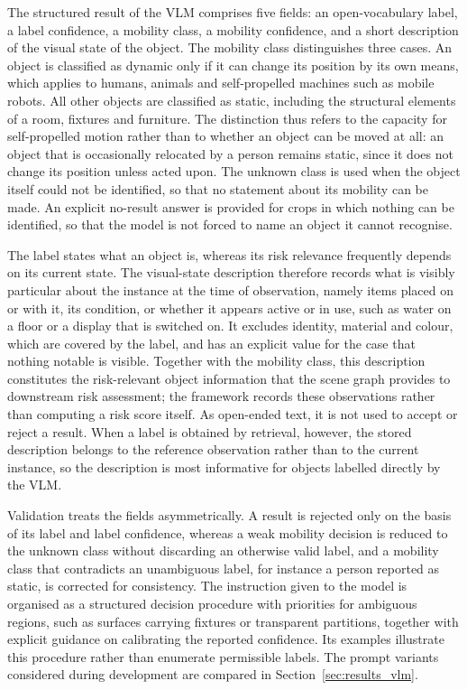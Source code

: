 {\small

The structured result of the VLM comprises five fields: an open-vocabulary label, a label confidence, a mobility class, a mobility confidence, and a short description of the visual state of the object. The mobility class distinguishes three cases. An object is classified as dynamic only if it can change its position by its own means, which applies to humans, animals and self-propelled machines such as mobile robots. All other objects are classified as static, including the structural elements of a room, fixtures and furniture. The distinction thus refers to the capacity for self-propelled motion rather than to whether an object can be moved at all: an object that is occasionally relocated by a person remains static, since it does not change its position unless acted upon. The unknown class is used when the object itself could not be identified, so that no statement about its mobility can be made. An explicit no-result answer is provided for crops in which nothing can be identified, so that the model is not forced to name an object it cannot recognise.

The label states what an object is, whereas its risk relevance frequently depends on its current state. The visual-state description therefore records what is visibly particular about the instance at the time of observation, namely items placed on or with it, its condition, or whether it appears active or in use, such as water on a floor or a display that is switched on. It excludes identity, material and colour, which are covered by the label, and has an explicit value for the case that nothing notable is visible. Together with the mobility class, this description constitutes the risk-relevant object information that the scene graph provides to downstream risk assessment; the framework records these observations rather than computing a risk score itself. As open-ended text, it is not used to accept or reject a result. When a label is obtained by retrieval, however, the stored description belongs to the reference observation rather than to the current instance, so the description is most informative for objects labelled directly by the VLM.

Validation treats the fields asymmetrically. A result is rejected only on the basis of its label and label confidence, whereas a weak mobility decision is reduced to the unknown class without discarding an otherwise valid label, and a mobility class that contradicts an unambiguous label, for instance a person reported as static, is corrected for consistency. The instruction given to the model is organised as a structured decision procedure with priorities for ambiguous regions, such as surfaces carrying fixtures or transparent partitions, together with explicit guidance on calibrating the reported confidence. Its examples illustrate this procedure rather than enumerate permissible labels. The prompt variants considered during development are compared in Section~\ref{sec:results_vlm}.

}
